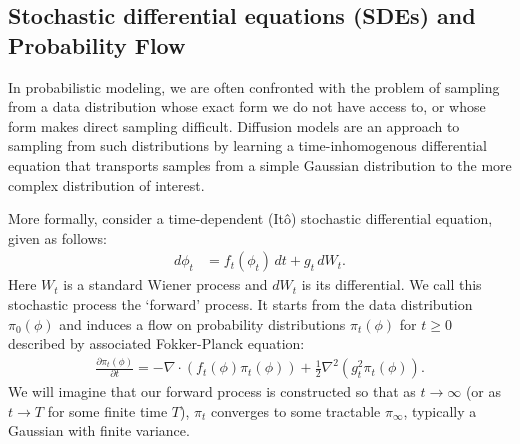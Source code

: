 \documentclass{article}
\theoremstyle{plain}
\theoremstyle{definition}
\theoremstyle{remark}
\begin{document}
\subsection{Stochastic differential equations (SDEs) and Probability Flow}
In probabilistic modeling, we are often confronted with the problem of sampling from a data distribution whose exact form we do not have access to, or whose form makes direct sampling difficult. Diffusion models are an approach to sampling from such distributions by learning a time-inhomogenous differential equation that transports samples from a simple Gaussian distribution to the more complex distribution of interest.

More formally, consider a time-dependent (Itô) stochastic differential equation, given as follows:
\begin{align}\label{eq:forward_sde}
    d\phi_t &= f_t(\phi_t) \,dt + g_t\,dW_t.
\end{align}
Here $W_t$ is a standard Wiener process and $dW_t$ is its differential. We call this stochastic process the `forward' process. It starts from the data distribution $\pi_0(\phi)$ and induces a flow on probability distributions $\pi_t(\phi)$ for $t\geq 0$ described by associated Fokker-Planck equation:
\begin{align}\label{eq:forward_flow}
    \frac{\partial \pi_t(\phi)}{\partial t} = -\nabla \cdot (f_t(\phi) \pi_t(\phi)) + \frac{1}{2} \nabla^2(g_t^2 \pi_t(\phi)).
\end{align}
We will imagine that our forward process is constructed so that as $t \to \infty$ (or as $t \to T$ for some finite time $T$), $\pi_t$ converges to some tractable $\pi_{\infty}$, typically a Gaussian with finite variance. 
\end{document}
